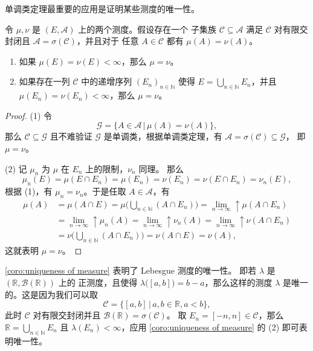 \documentclass[fontset=none]{Notes}
\newcommand{\ulim}[1][]{\lim_{#1}\mathrel{\uparrow}}
\begin{document}
单调类定理最重要的应用是证明某些测度的唯一性。

\begin{corollary}\label{coro:uniqueness of measure}
  令 $\mu,\nu$ 是 $(E,\mathcal{A})$ 上的两个测度。假设存在一个
  子集族 $\mathcal{C}\subseteq \mathcal{A}$ 满足 $\mathcal{C}$
  对有限交封闭且 $\mathcal{A}=\sigma(\mathcal{C})$，并且对于
  任意 $A\in \mathcal{C}$ 都有 $\mu(A)=\nu(A)$。
  \begin{enumerate}
    \item 如果 $\mu(E)=\nu(E)<\infty$，那么 $\mu=\nu$。
    \item 如果存在一列 $\mathcal{C}$ 中的递增序列 $(E_n)_{n\in \mathbb{N}}$ 
    使得 $E=\bigcup_{n\in \mathbb{N}}E_n$，并且
    $\mu(E_n)=\nu(E_n)<\infty$，那么 $\mu=\nu$。
  \end{enumerate}
\end{corollary}
\begin{proof}
  (1) 令
  \[
    \mathcal{G}=\{A\in \mathcal{A}\,|\,\mu(A)=\nu(A)\},
  \]
  那么 $\mathcal{C}\subseteq \mathcal{G}$ 且不难验证 $\mathcal{G}$
  是单调类，根据单调类定理，有 $\mathcal{A}=\sigma(\mathcal{C})\subseteq \mathcal{G}$，
  即 $\mu=\nu$。

  (2) 记 $\mu_n$ 为 $\mu$ 在 $E_n$ 上的限制，$\nu_n$ 同理。
  那么
  \[
    \mu_n(E)=\mu(E\cap E_n)=\mu(E_n)=\nu(E_n)=\nu(E\cap E_n)  
    =\nu_n(E),
  \]
  根据 (1)，有 $\mu_n=\nu_n$。于是任取 $A\in \mathcal{A}$，有
  \begin{align*}
    \mu (A)&=\mu(A\cap E)=\mu\biggl(\bigcup_{n\in \mathbb{N}}(A\cap E_n)\biggr)
    =\ulim[n\to\infty]\mu(A\cap E_n)\\
    &=\ulim[n\to\infty]\mu_n(A)=\ulim[n\to\infty]\nu_n(A)
    =\ulim[n\to\infty]\nu(A\cap E_n)\\
    &=\nu\biggl(\bigcup_{n\in \mathbb{N}}(A\cap E_n)\biggr)
    =\nu(A\cap E)=\nu(A),
  \end{align*}
  这就表明 $\mu=\nu$。
\end{proof}

\autoref{coro:uniqueness of measure} 表明了 Lebesgue 测度的唯一性。
即若 $\lambda$ 是 $(\mathbb{R},\mathcal{B}(\mathbb{R}))$ 上的 
正测度，且使得 $\lambda\bigl([a,b]\bigr)=b-a$，那么这样的测度 $\lambda$
是唯一的。这是因为我们可以取
\[
  \mathcal{C}=\big\{[a,b]\,|\, a,b\in \mathbb{R},a<b\big\}  ,
\]
此时 $\mathcal{C}$ 对有限交封闭并且 $\mathcal{B}(\mathbb{R})=\sigma(\mathcal{C})$。
取 $E_n=[-n,n]\in \mathcal{C}$，那么 $\mathbb{R}=\bigcup_{n\in \mathbb{N}} E_n$
且 $\lambda(E_n)<\infty$，应用 \autoref{coro:uniqueness of measure}
的 (2) 即可表明唯一性。
\end{document}

